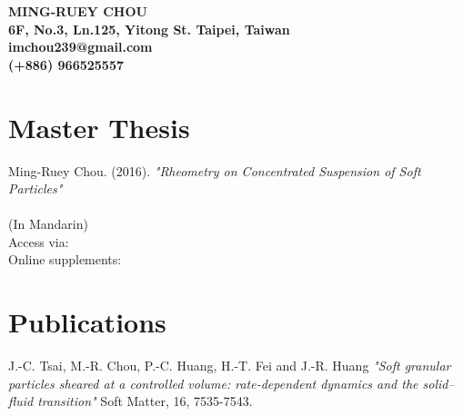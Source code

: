 \documentclass[10pt,a4paper]{article}
\newcommand\publication[1]{%
    \smallskip\par\hangpara{1.5em}{1}\bibentry{#1}\smallskip
}
\newcommand{\bwhref}[3][black]{\href{#2}{\color{#1}{#3}}}
\begin{document}
    \begin{center}
    \large\bf MING-RUEY CHOU\\ %
    6F, No.3, Ln.125, Yitong St. Taipei, Taiwan\\imchou239@gmail.com\\(+886) 966525557%
    \end{center} 


    \section*{Master Thesis} 
    Ming-Ruey Chou. (2016).
    \textit{"Rheometry on Concentrated Suspension of Soft Particles"} \\ \\
    (In Mandarin) \\
    Access via: \bwhref{https://hdl.handle.net/11296/n57euw}{https://hdl.handle.net/11296/n57euw}\\
    Online supplements: \bwhref{www.phys.sinica.edu.tw/jctsai/Ray2016}{www.phys.sinica.edu.tw/jctsai/Ray2016}

    \section*{Publications} 
     J.-C. Tsai, M.-R. Chou, P.-C. Huang, H.-T. Fei and J.-R. Huang
    \textit{"Soft granular particles sheared at a controlled volume: rate-dependent dynamics and the solid–fluid transition"} Soft Matter, 16, 7535-7543.


    
\end{document}
